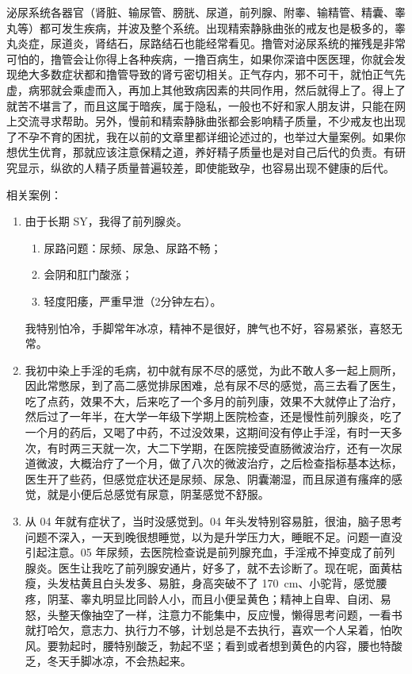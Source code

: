 \documentclass{ctexart}
\begin{document}
泌尿系统各器官（肾脏、输尿管、膀胱、尿道，前列腺、附睾、输精管、精囊、睾丸等）都可发生疾病，并波及整个系统。出现精索静脉曲张的戒友也是极多的，睾丸炎症，尿道炎，肾结石，尿路结石也能经常看见。撸管对泌尿系统的摧残是非常可怕的，撸管会让你得上各种疾病，一撸百病生，如果你深谙中医医理，你就会发现绝大多数症状都和撸管导致的肾亏密切相关。正气存内，邪不可干，就怕正气先虚，病邪就会乘虚而入，再加上其他致病因素的共同作用，然后就得上了。得上了就苦不堪言了，而且这属于暗疾，属于隐私，一般也不好和家人朋友讲，只能在网上交流寻求帮助。另外，慢前和精索静脉曲张都会影响精子质量，不少戒友也出现了不孕不育的困扰，我在以前的文章里都详细论述过的，也举过大量案例。如果你想优生优育，那就应该注意保精之道，养好精子质量也是对自己后代的负责。有研究显示，纵欲的人精子质量普遍较差，即使能致孕，也容易出现不健康的后代。

相关案例：

\begin{enumerate}
    \item 由于长期 SY，我得了前列腺炎。\begin{enumerate}
        \item 尿路问题：尿频、尿急、尿路不畅；
        \item 会阴和肛门酸涨；
        \item 轻度阳痿，严重早泄（2分钟左右）。
    \end{enumerate} 我特别怕冷，手脚常年冰凉，精神不是很好，脾气也不好，容易紧张，喜怒无常。
    \item 我初中染上手淫的毛病，初中就有尿不尽的感觉，为此不敢人多一起上厕所，因此常憋尿，到了高二感觉排尿困难，总有尿不尽的感觉，高三去看了医生，吃了点药，效果不大，后来吃了一个多月的前列康，效果不大就停止了治疗，然后过了一年半，在大学一年级下学期上医院检查，还是慢性前列腺炎，吃了一个月的药后，又喝了中药，不过没效果，这期间没有停止手淫，有时一天多次，有时两三天就一次，大二下学期，在医院接受直肠微波治疗，还有一次尿道微波，大概治疗了一个月，做了八次的微波治疗，之后检查指标基本达标，医生开了些药，但感觉症状还是尿频、尿急、阴囊潮湿，而且尿道有瘙痒的感觉，就是小便后总感觉有尿意，阴茎感觉不舒服。
    \item 从 04 年就有症状了，当时没感觉到。04 年头发特别容易脏，很油，脑子思考问题不深入，一天到晚很想睡觉，以为是升学压力大，睡眠不足。问题一直没引起注意。05 年尿频，去医院检查说是前列腺充血，手淫戒不掉变成了前列腺炎。医生让我吃了前列腺安通片，好多了，就不去诊断了。现在呢，面黄枯瘦，头发枯黄且白头发多、易脏，身高突破不了 \SI{170}{\centi\metre}、小驼背，感觉腰疼，阴茎、睾丸明显比同龄人小，而且小便呈黄色；精神上自卑、自闭、易怒，头整天像抽空了一样，注意力不能集中，反应慢，懒得思考问题，一看书就打哈欠，意志力、执行力不够，计划总是不去执行，喜欢一个人呆着，怕吹风。要勃起时，腰特别酸乏，勃起不坚；看到或者想到黄色的内容，腰也特酸乏，冬天手脚冰凉，不会热起来。
\end{enumerate}
\end{document}
